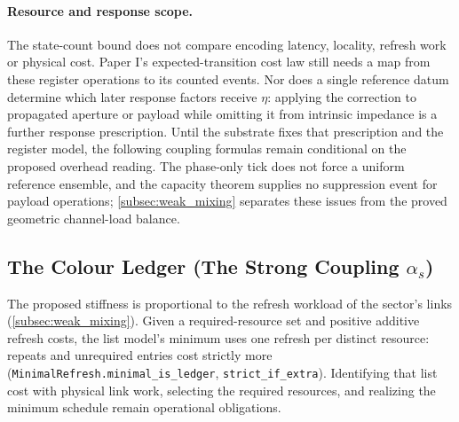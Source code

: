 \paragraph{Resource and response scope.}
The state-count bound does not compare encoding latency, locality, refresh work or physical cost. Paper I's expected-transition cost law still needs a map from these register operations to its counted events. Nor does a single reference datum determine which later response factors receive $\eta$: applying the correction to propagated aperture or payload while omitting it from intrinsic impedance is a further response prescription. Until the substrate fixes that prescription and the register model, the following coupling formulas remain conditional on the proposed overhead reading. The phase-only tick does not force a uniform reference ensemble, and the capacity theorem supplies no suppression event for payload operations; \cref{subsec:weak_mixing} separates these issues from the proved geometric channel-load balance.

\subsection{The Colour Ledger (The Strong Coupling \texorpdfstring{$\alpha_s$}{alpha\_s})}
\label{subsec:saturation_ratio}

The proposed stiffness is proportional to the refresh workload of the sector's links (\cref{subsec:weak_mixing}). Given a required-resource set and positive additive refresh costs, the list model's minimum uses one refresh per distinct resource: repeats and unrequired entries cost strictly more (\texttt{MinimalRefresh.minimal\_is\_ledger}, \texttt{strict\_if\_extra}). Identifying that list cost with physical link work, selecting the required resources, and realizing the minimum schedule remain operational obligations.

